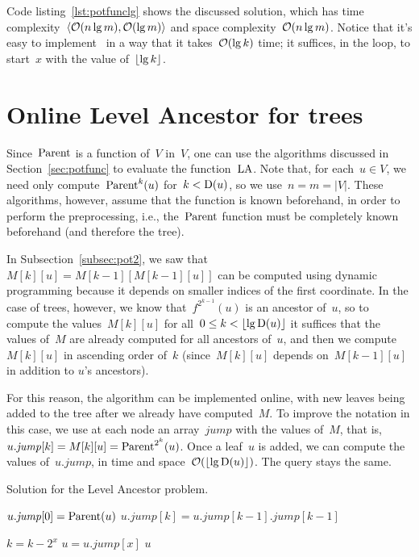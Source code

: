 \documentclass[main.tex]{subfiles}
\begin{document}
Code listing~\ref{lst:potfunclg} shows the discussed solution, which has time complexity~$\langle\mathcal{O}(n\lg m), \mathcal{O}(\lg m)\rangle$ and space complexity~$\mathcal{O}(n \lg m)$. Notice that it's easy to implement~ in a way that it takes~$\mathcal{O}(\lg k)$ time; it suffices, in the loop, to start~$x$ with the value of~$\lfloor\lg k\rfloor$.

\section{Online Level Ancestor for trees}

Since~$\operatorname{Parent}$ is a function of~$V$ in~$V$, one can use the algorithms discussed in Section~\ref{sec:potfunc} to evaluate the function~$\operatorname{LA}$. Note that, for each~$u \in V$, we need only compute~$\operatorname{Parent}^k(u)$ for~$k < \operatorname{D}(u)$, so we use~$n = m = |V|$. These algorithms, however, assume that the function is known beforehand, in order to perform the preprocessing, i.e., the~$\operatorname{Parent}$ function must be completely known beforehand (and therefore the tree).

\newcommand{\jmp}{\mathit{jump}}
In Subsection~\ref{subsec:pot2}, we saw that~$M[k][u] = M[k-1][M[k-1][u]]$ can be computed using dynamic programming because it depends on smaller indices of the first coordinate. In the case of trees, however, we know that~$f^{2^{k-1}}(u)$ is an ancestor of~$u$, so to compute the values~$M[k][u]$ for all~${0 \leq k < \lfloor\lg \operatorname{D}(u)\rfloor}$ it suffices that the values of~$M$ are already computed for all ancestors of~$u$, and then we compute~$M[k][u]$ in ascending order of~$k$ (since~$M[k][u]$ depends on~$M[k-1][u]$ in addition to $u$'s ancestors).

For this reason, the algorithm can be implemented online, with new leaves being added to the tree after we already have computed~$M$. To improve the notation in this case, we use at each node an array~$\jmp$ with the values of~$M$, that is,~${u.\jmp[k] = M[k][u] = \Par^{2^k}(u)}$. Once a leaf~$u$ is added, we can compute the values of~$u.\jmp$, in time and space~${\mathcal{O}(\lfloor\lg \operatorname{D}(u)\rfloor)}$. The query stays the same.

\begin{algorithm}
\caption{Solution for the Level Ancestor problem.} \label{lst:lapot2}
\begin{algorithmic}[1]
		\State $u.\jmp[0] = \Par(u)$
			\State $u.\jmp[k] = u.\jmp[k - 1].\jmp[k - 1]$
		\EndFor
	\EndFunction

				\State $k = k - 2^x$
				\State $u = u.\jmp[x]$
			\EndIf
		\EndFor
		\State \Return $u$
	\EndFunction
\end{algorithmic}
\end{algorithm}
\end{document}
